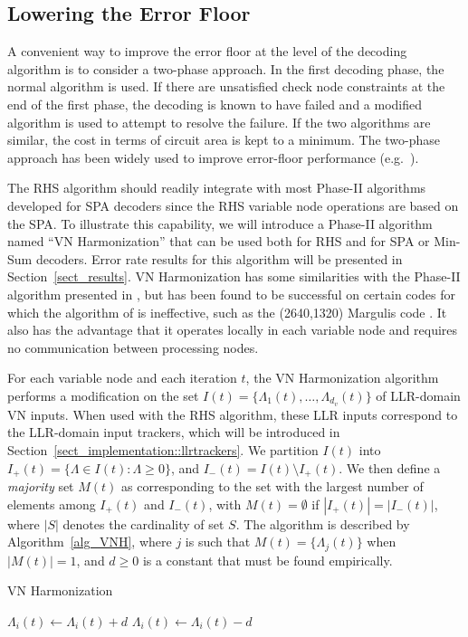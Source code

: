 \documentclass[12pt,journal,twoside,draftcls,onecolumn]{IEEEtran}
\begin{document}
\subsection{Lowering the Error Floor}
\label{sect_floor}
A convenient way to improve the error floor at the level of the decoding algorithm is to consider a two-phase approach. In the first decoding phase, the normal algorithm is used. If there are unsatisfied check node constraints at the end of the first phase, the decoding is known to have failed and a modified algorithm is used to attempt to resolve the failure. If the two algorithms are similar, the cost in terms of circuit area is kept to a minimum. The two-phase approach has been widely used to improve error-floor performance (e.g.~\cite{varnica:2006,zhang:2008a,leduc-primeau:2010}).

The RHS algorithm should readily integrate with most Phase-II algorithms developed for SPA decoders since the RHS variable node operations are based on the SPA.
To illustrate this capability, we will introduce a Phase-II algorithm named ``VN Harmonization'' that can be used both for RHS and for SPA or Min-Sum decoders. Error rate results for this algorithm will be presented in Section~\ref{sect_results}.
VN Harmonization has some similarities with the Phase-II algorithm presented in \cite{zhang:2008a}, but has been found to be successful on certain codes for which the algorithm of \cite{zhang:2008a} is ineffective, such as the (2640,1320) Margulis code \cite{rosenthal:2000}. It also has the advantage that it operates locally in each variable node and requires no communication between processing nodes.

For each variable node and each iteration $t$, the VN Harmonization algorithm performs a modification on the set $I(t) = \{\Lambda_1(t), \ldots, \Lambda_{d_v}(t)\}$ of LLR-domain VN inputs. When used with the RHS algorithm, these LLR inputs correspond to the LLR-domain input trackers, which will be introduced in Section~\ref{sect_implementation::llrtrackers}.
We partition $I(t)$ into $I_{+}(t) = \{\Lambda \in I(t) : \Lambda \geq 0\}$, and $I_{-}(t) = I(t) \setminus I_{+}(t)$.
We then define a \emph{majority} set $M(t)$ as corresponding to the set with the largest number of elements among $I_{+}(t)$ and $I_{-}(t)$, with $M(t) = \emptyset$ if $|I_{+}(t)| = |I_{-}(t)|$, where $|S|$ denotes the cardinality of set $S$.
The algorithm is described by Algorithm~\ref{alg_VNH}, where $j$ is such that $M(t) = \{\Lambda_j(t)\}$ when $|M(t)|=1$, and $d \geq 0$ is a constant that must be found empirically.
\begin{algorithm}
\caption{VN Harmonization}\label{alg_VNH}
\begin{algorithmic}
			\State $\Lambda_i(t) \gets \Lambda_i(t) + d$
		\Else
			\State $\Lambda_i(t) \gets \Lambda_i(t) - d$
		\EndIf
	\EndFor
\EndIf
\end{algorithmic}
\end{algorithm}
\end{document}
